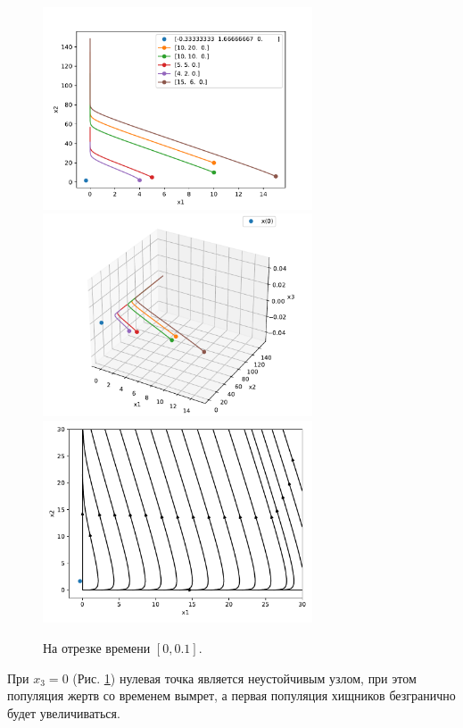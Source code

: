     \begin{figure}[H]
        \centering
        \includegraphics[width=8cm]{pictures/x3_0phase.pdf}
        \includegraphics[width=8cm]{pictures/x3_0phase3.pdf}
        \includegraphics[width=8cm]{pictures/x3_0vector.pdf}
        \caption{На отрезке времени \( [0, 0.1] \).} \label{lvx3_0}
    \end{figure}
    При \(x_3 = 0\) (Рис. \ref{lvx3_0}) нулевая точка является неустойчивым узлом, при этом популяция жертв со временем вымрет, а первая популяция хищников безгранично будет увеличиваться.

